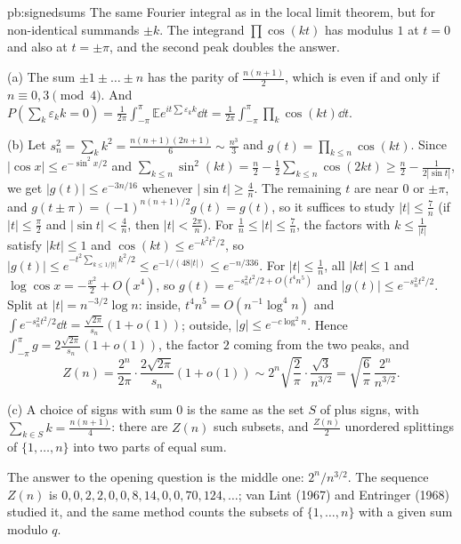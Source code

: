 \begin{solution}{pb:signedsums}
\idea The same Fourier integral as in the local limit theorem, but for non-identical summands $\pm k$. The integrand $\prod\cos(kt)$ has modulus $1$ at $t=0$ and
also at $t=\pm\pi$, and the second peak doubles the answer.

\writeup (a) The sum $\pm1\pm\dots\pm n$ has the parity of $\frac{n(n+1)}2$, which is even if and only if $n\equiv0,3\pmod4$. And
$P(\sum_k\varepsilon_kk=0)=\frac1{2\pi}\int_{-\pi}^\pi\mathbb Ee^{it\sum\varepsilon_kk}\dd t=\frac1{2\pi}\int_{-\pi}^\pi\prod_k\cos(kt)\dd t$.

(b) Let $s_n^2=\sum_kk^2=\frac{n(n+1)(2n+1)}6\sim\frac{n^3}3$ and $g(t)=\prod_{k\le n}\cos(kt)$. Since $|\cos x|\le e^{-\sin^2x/2}$ and $\sum_{k\le n}\sin^2(kt)=\frac n2-\frac12\sum_{k\le n}\cos(2kt)\ge\frac n2-\frac1{2|\sin t|}$,
we get $|g(t)|\le e^{-3n/16}$ whenever $|\sin t|\ge\frac4n$. The remaining $t$ are near $0$ or $\pm\pi$, and $g(t\pm\pi)=(-1)^{n(n+1)/2}g(t)=g(t)$, so it suffices to study $|t|\le\frac7n$ (if $|t|\le\frac\pi2$ and $|\sin t|<\frac4n$, then $|t|<\frac{2\pi}n$). For $\frac1{n}\le|t|\le\frac7n$, the factors with $k\le\frac1{|t|}$ satisfy $|kt|\le1$ and $\cos(kt)\le e^{-k^2t^2/2}$, so
$|g(t)|\le e^{-t^2\sum_{k\le1/|t|}k^2/2}\le e^{-1/(48|t|)}\le e^{-n/336}$. For $|t|\le\frac1n$, all $|kt|\le1$ and $\log\cos x=-\frac{x^2}2+O(x^4)$, so
$g(t)=e^{-s_n^2t^2/2+O(t^4n^5)}$ and $|g(t)|\le e^{-s_n^2t^2/2}$. Split at $|t|=n^{-3/2}\log n$: inside, $t^4n^5=O(n^{-1}\log^4n)$ and $\int e^{-s_n^2t^2/2}\dd t=\frac{\sqrt{2\pi}}{s_n}(1+o(1))$;
outside, $|g|\le e^{-c\log^2n}$. Hence $\int_{-\pi}^\pi g=2\frac{\sqrt{2\pi}}{s_n}(1+o(1))$, the factor $2$ coming from the two peaks, and
\[
Z(n)=\frac{2^n}{2\pi}\cdot\frac{2\sqrt{2\pi}}{s_n}(1+o(1))\sim2^n\sqrt{\frac2\pi}\cdot\frac{\sqrt3}{n^{3/2}}=\sqrt{\frac6\pi}\,\frac{2^n}{n^{3/2}}.
\]

(c) A choice of signs with sum $0$ is the same as the set $S$ of plus signs, with $\sum_{k\in S}k=\frac{n(n+1)}4$: there are $Z(n)$ such subsets, and $\frac{Z(n)}2$ unordered
splittings of $\{1,\dots,n\}$ into two parts of equal sum.

\leads The answer to the opening question is the middle one: $2^n/n^{3/2}$. The sequence $Z(n)$ is $0,0,2,2,0,0,8,14,0,0,70,124,\dots$; van Lint (1967) and Entringer (1968)
studied it, and the same method counts the subsets of $\{1,\dots,n\}$ with a given sum modulo $q$.
\end{solution}

